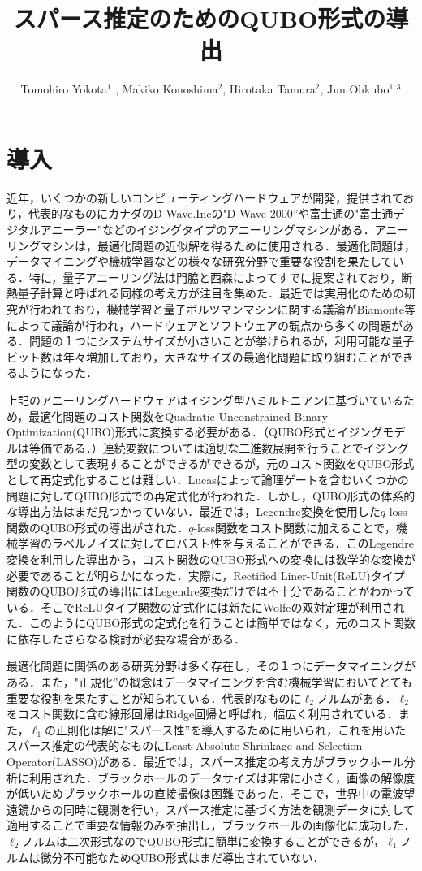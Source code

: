 \documentclass[fp,twocolumn]{jpsj3}
\title{スパース推定のためのQUBO形式の導出}
\author{Tomohiro Yokota$^1$%
  , Makiko Konoshima$^2$, Hirotaka Tamura$^2$, Jun Ohkubo$^{1,3}$}
\begin{document}
\maketitle

\section{導入}
近年，いくつかの新しいコンピューティングハードウェアが開発，提供されており，代表的なものにカナダのD-Wave.Incの"D-Wave 2000''や富士通の"富士通デジタルアニーラー''などのイジングタイプのアニーリングマシンがある．アニーリングマシンは，最適化問題の近似解を得るために使用される．最適化問題は，データマイニングや機械学習などの様々な研究分野で重要な役割を果たしている．特に，量子アニーリング法は門脇と西森によってすでに提案されており，断熱量子計算と呼ばれる同様の考え方が注目を集めた．最近では実用化のための研究が行われており，機械学習と量子ボルツマンマシンに関する議論がBiamonte等によって議論が行われ，ハードウェアとソフトウェアの観点から多くの問題がある．問題の１つにシステムサイズが小さいことが挙げられるが，利用可能な量子ビット数は年々増加しており，大きなサイズの最適化問題に取り組むことができるようになった．

上記のアニーリングハードウェアはイジング型ハミルトニアンに基づいているため，最適化問題のコスト関数をQuadratic Unconstrained Binary Optimization(QUBO)形式に変換する必要がある．（QUBO形式とイジングモデルは等価である．）連続変数については適切な二進数展開を行うことでイジング型の変数として表現することができるができるが，元のコスト関数をQUBO形式として再定式化することは難しい．Lucasによって論理ゲートを含むいくつかの問題に対してQUBO形式での再定式化が行われた．しかし，QUBO形式の体系的な導出方法はまだ見つかっていない．最近では，Legendre変換を使用した$q$-loss関数のQUBO形式の導出がされた．$q$-loss関数をコスト関数に加えることで，機械学習のラベルノイズに対してロバスト性を与えることができる．このLegendre変換を利用した導出から，コスト関数のQUBO形式への変換には数学的な変換が必要であることが明らかになった．実際に，Rectified Liner-Unit(ReLU)タイプ関数のQUBO形式の導出にはLegendre変換だけでは不十分であることがわかっている．そこでReLUタイプ関数の定式化には新たにWolfeの双対定理が利用された．このようにQUBO形式の定式化を行うことは簡単ではなく，元のコスト関数に依存したさらなる検討が必要な場合がある．

最適化問題に関係のある研究分野は多く存在し，その１つにデータマイニングがある．また，"正規化''の概念はデータマイニングを含む機械学習においてとても重要な役割を果たすことが知られている．代表的なものに$\ell_{2}$ノルムがある．$\ell_{2}$をコスト関数に含む線形回帰はRidge回帰と呼ばれ，幅広く利用されている．また，$\ell_{1}$の正則化は解に"スパース性''を導入するために用いられ，これを用いたスパース推定の代表的なものにLeast Absolute Shrinkage and Selection Operator(LASSO)がある．最近では，スパース推定の考え方がブラックホール分析に利用された．ブラックホールのデータサイズは非常に小さく，画像の解像度が低いためブラックホールの直接撮像は困難であった．そこで，世界中の電波望遠鏡からの同時に観測を行い，スパース推定に基づく方法を観測データに対して適用することで重要な情報のみを抽出し，ブラックホールの画像化に成功した．$\ell_{2}$ノルムは二次形式なのでQUBO形式に簡単に変換することができるが，$\ell_{1}$ノルムは微分不可能なためQUBO形式はまだ導出されていない．
\end{document}
